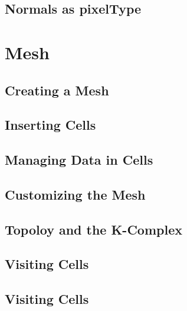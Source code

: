 



\subsection{Normals as pixelType}
\label{sec:PointSetWithCovariantVectorsAsPixelType}






\section{Mesh}\label{MeshSection}

\subsection{Creating a Mesh}
\label{sec:CreatingAMesh}




\subsection{Inserting Cells}
\label{sec:InsertingCellsInMesh}




\subsection{Managing Data in Cells}
\label{sec:ManagingCellDataInMesh}




\subsection{Customizing the Mesh}
\label{sec:CustomizingTheMesh}




\subsection{Topoloy and the K-Complex}
\label{sec:MeshKComplex}




\subsection{Visiting Cells}
\label{sec:MeshCellsIteration}




\subsection{Visiting Cells}
\label{sec:MeshCellVisitor}




